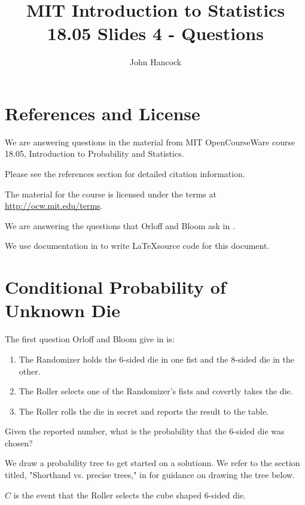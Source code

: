 \documentclass[a4paper,11pt]{article}
\author{John Hancock}
\title{MIT Introduction to Statistics 18.05 Slides 4 - Questions }
\begin{document}
\maketitle
\tableofcontents
\section{References and License}
We are answering questions in the material from MIT OpenCourseWare
course 18.05, Introduction to Probability and Statistics.

Please see the references section for detailed citation information.

The material for the course is licensed under the terms at 
\url{http://ocw.mit.edu/terms}.

We are answering the questions that Orloff and Bloom ask in
\cite{slides4}.

We use documentation in \cite{blockQuote} to write \LaTeX source code
for this document.
 
\section{Conditional Probability of Unknown Die}

The first question Orloff and Bloom give in \cite{slides4} is:
\begin{displayquote}

\begin{enumerate}
  \item The Randomizer holds the 6-sided die in one fist and the 8-sided
  die in the other.

  \item The Roller selects one of the Randomizer’s fists and covertly 
   takes the die.

  \item The Roller rolls the die in secret and reports the result to the
  table.
\end{enumerate}

Given the reported number, what is the probability that the 6-sided die
was chosen? 
\end{displayquote}

We draw a probability tree to get started on a solutionn.  We refer
to the section titled, "Shorthand vs. precise trees," in \cite{reading3}
for guidance on drawing the tree below.

$C$ is the event that the Roller selects the cube shaped $6$-sided die.
\end{document}
